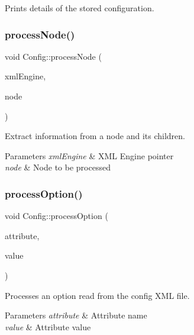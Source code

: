 Prints details of the stored configuration. 

\mbox{\label{class_config_a46d81f90a7b6218385e8bfd0a283f6ce}} 
\subsubsection{\texorpdfstring{process\+Node()}{processNode()}}
{\footnotesize\ttfamily void Config\+::process\+Node (\begin{DoxyParamCaption}\item[{T\+X\+M\+L\+Engine $\ast$}]{xml\+Engine,  }\item[{X\+M\+L\+Node\+Pointer\+\_\+t}]{node }\end{DoxyParamCaption})\hspace{0.3cm}{\ttfamily [private]}}



Extract information from a node and its children. 


\begin{DoxyParams}{Parameters}
{\em xml\+Engine} & X\+ML Engine pointer \\
\hline
{\em node} & Node to be processed \\
\hline
\end{DoxyParams}
\mbox{\label{class_config_a42e48f8b6446cdc46badd09f6446a328}} 
\subsubsection{\texorpdfstring{process\+Option()}{processOption()}}
{\footnotesize\ttfamily void Config\+::process\+Option (\begin{DoxyParamCaption}\item[{const std\+::string}]{attribute,  }\item[{const std\+::string}]{value }\end{DoxyParamCaption})\hspace{0.3cm}{\ttfamily [private]}}



Processes an option read from the config X\+ML file. 


\begin{DoxyParams}{Parameters}
{\em attribute} & Attribute name \\
\hline
{\em value} & Attribute value \\
\hline
\end{DoxyParams}


